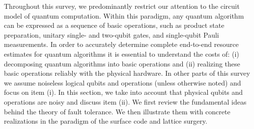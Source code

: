 \documentclass[a4paper,11pt,notitlepage]{report}
\begin{document}
Throughout this survey, we predominantly restrict our attention to the circuit model of quantum computation.
Within this paradigm, any quantum algorithm can be expressed as a sequence of basic operations, such as product state preparation, unitary single- and two-qubit gates, and single-qubit Pauli measurements.
In order to accurately determine complete end-to-end resource estimates for quantum algorithms it is essential to understand the costs of: (i) decomposing quantum algorithms into basic operations and (ii) realizing these basic operations reliably with the physical hardware.
In other parts of this survey we assume noiseless logical qubits and operations (unless otherwise noted) and focus on item (i). In this section, we take into account that physical qubits and operations are noisy and discuss item (ii).
We first review the fundamental ideas behind the theory of fault tolerance.
We then illustrate them with concrete realizations in the paradigm of the surface code and lattice surgery.

\localtableofcontents

\newpage

\pagestyle{wikiheader}


% 

\endgroup  %


\begingroup
\newpage
\pagestyle{chapterpage}
\nocite{*}
\printbibliography[env=globalbibliography, title={Consolidated bibliography}, category=cited, heading=bibintoc]\label{ch:globalbib}
\endgroup
\end{document}
